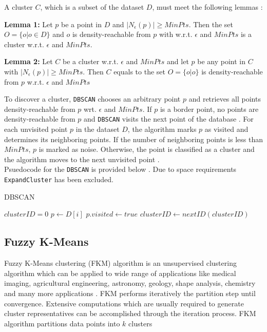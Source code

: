 \documentclass[conference, 10pt]{IEEEtran}
\begin{document}
A cluster $C$, which is a subset of the dataset $D$, must meet the following lemmas \cite{dbscan}:

\begin{description}
  \item{\textbf{Lemma 1:}} Let $p$ be a point in $D$ and $|N_{\epsilon}(p)| \geq MinPts$. Then the set $O = \{o | o \in D \}$ and $o$ is density-reachable from $p$ with w.r.t. $\epsilon$ and $MinPts$ is a cluster w.r.t. $\epsilon$ and $MinPts$.
  \item{\textbf{Lemma 2:}} Let $C$ be a cluster w.r.t. $\epsilon$ and $MinPts$ and let $p$ be any point in $C$ with $|N_{\epsilon}(p)| \geq MinPts$. Then $C$ equals to the set $O = \{o | o\}$ is density-reachable from $p$ w.r.t. $\epsilon$ and $MinPts$
\end{description}
To discover a cluster, \texttt{DBSCAN} chooses an arbitrary point $p$ and retrieves all points density-reachable from $p$ wrt. $\epsilon$ and $MinPts$. If $p$ is a border point, no points are density-reachable from $p$ and \texttt{DBSCAN} visits the next point of the database \cite{dbscan}. For each unvisited point $p$ in the dataset $D$, the algorithm marks $p$ as visited and determines its neighboring points. If the number of neighboring points is less than $MinPts$, $p$ is marked as noise. Otherwise, the point is classified as a cluster and the algorithm moves to the next unvisited point \cite{dbscan}. \\

Psuedocode for the \texttt{DBSCAN} is provided below \cite{dbscan}. Due to space requirements \texttt{ExpandCluster} has been excluded.

\begin{algorithm}
\caption{DBSCAN}
\begin{algorithmic}[1]
  \State $clusterID = 0$
      \State $p \gets D[i]$
      \State $p.visited \gets true$
          \State $clusterID \gets nextID(clusterID)$
        \EndIf
      \EndIf
  \EndFor
\EndProcedure
\Statex
\end{algorithmic}
\end{algorithm}

\subsection{Fuzzy K-Means}
Fuzzy K-Means clustering (FKM) algorithm is an unsupervised clustering algorithm which can be
applied to wide range of applications like medical imaging, agricultural engineering, astronomy,
geology, shape analysis, chemistry and many more applications \cite{pattern}. FKM performs iteratively the partition step until convergence. Extensive computations which are usually required to generate cluster representatives can be accomplished through the iteration process. FKM algorithm partitions data points into $k$ clusters
\end{document}
